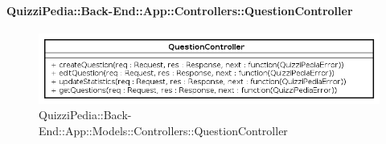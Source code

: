 \paragraph{QuizziPedia::Back-End::App::Controllers::QuestionController}
\label{QuizziPedia::Back-End::App::Controllers::QuestionController}
\begin{figure}[ht]
	\centering
	\includegraphics[scale=0.45]{UML/Classi/Back-End/QuizziPedia_Back-End_App_Controllers_questionController.png}
	\caption{QuizziPedia::Back-End::App::Models::Controllers::QuestionController}
\end{figure}
\FloatBarrier
